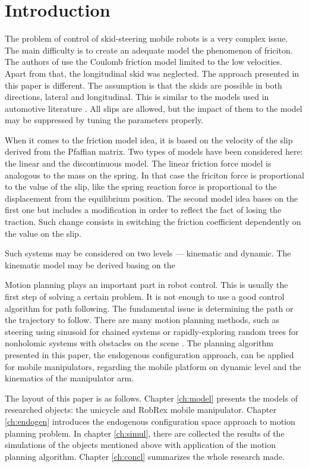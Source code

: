 \chapter{Introduction}
The problem of control of skid-steering mobile robots is a very complex issue. 
The main difficulty is to create an adequate model the phenomenon of friciton. 
The authors of \cite{caracciolo1999trajectory} use the Coulomb friction model limited to the low velocities.
Apart from that, the longitudinal skid was neglected. The approach presented in this paper is different.
The assumption is that the skids are possible in both directions, lateral and longitudinal.
This is similar to the models used in automotive literature \cite{pacejka2005tyre}.
All slips are allowed, but the impact of them to the model may be suppressed by tuning the
parameters properly. 

When it comes to the friction model idea, it is based on the velocity of the slip derived
from the Pfaffian matrix. %
Two types of models have been considered here: the linear and the discontinuous model.
The linear friction force model is analogous to the mass on the spring. In that case the friciton
force is proportional to the value of the slip, like the spring reaction force is proportional
to the displacement from the equilibrium position. The second model idea bases on the first one
but includes a modification in order to reflect the fact of losing the traction. Such change
consists in switching the friction coefficient dependently on the value on the slip.

Such systems may be considered on two levels --- kinematic and dynamic. The kinematic model may be
derived basing on the 

Motion planning plays an important part in robot control. This is usually the first step of solving
a certain problem. It is not enough to use a good control algorithm for path following. The fundamental
issue is determining the path or the trajectory to follow. There are many motion planning methods,
such as steering using sinusoid for chained systems \cite{murray1993nonholonomic} or rapidly-exploring random trees for nonholomic systems
with obstacles on the scene \cite{lavalle2000rapidly}. The planning algorithm presented in this paper,
the endogenous configuration approach, can be applied for mobile manipulators, regarding the
mobile platform on dynamic level and the kinematics of the manipulator arm.

The layout of this paper is as follows. Chapter \ref{ch:model} presents the models of researched
objects: the unicycle and RobRex mobile manipulator. Chapter \ref{ch:endogen} introduces the endogenous
configuration space approach to motion planning problem. In chapter \ref{ch:simul}, there are collected
the results of the simulations of the objects mentioned above with application of the motion
planning algorithm. Chapter \ref{ch:concl} summarizes the whole research made.